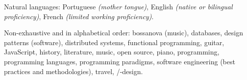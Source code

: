 \documentclass[10pt,a4paper]{article}
\begin{document}
\vspace{0.5em}
\inlineheadsection
  {Natural languages:}
  {Portuguese \emph{(mother tongue)}, English \emph{(native or bilingual proficiency)}, French \emph{(limited working proficiency)}.}


\spacedhrule{1.6em}{-0.4em}


\inlineheadsection
  {Non-exhaustive and in alphabetical order:}
  {bossanova (music), databases, design patterns (software), distributed systems, functional programming, guitar, JavaScript, history, literature, music, open source, piano, programming, programming languages, programming paradigms, software engineering (best practices and methodologies), travel, /-design.}
\end{document}
